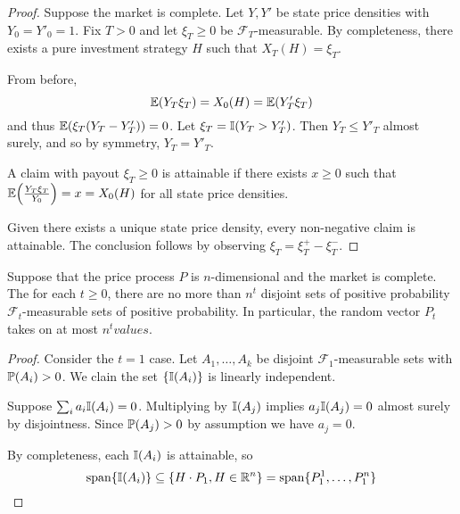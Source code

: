 \begin{proof}
  Suppose the market is complete.  Let $Y, Y'$ be state price
  densities with $Y_{0} = Y'_{0}  = 1$.  Fix $T > 0$ and let $\xi_{T}
  \geq 0$ be $\mathcal{F}_{T}$-measurable.  By completeness, there
  exists a pure investment strategy $H$ such that $X_{T}(H) =
  \xi_{T}$.

  From before,
  \begin{equation}
    \label{eq:25}
    \E{Y_{T} \xi_{T}} = X_{0}(H) = \E{Y'_{T} \xi_{T}}
  \end{equation} and thus $\E{\xi_{T}(Y_{T} - Y'_{T})} = 0$.  Let
  $\xi_{T} = \I{Y_{T} > Y'_{T}}$. Then $Y_{T} \leq Y'_{T}$ almost
  surely, and so by symmetry, $Y_{T} = Y'_{T}$.

  A claim with payout $\xi_{T} \geq 0$ is attainable if there exists
  $x \geq 0$ such that $\E{\frac{Y_{T} \xi_{T}}{Y_{0}}} = x =
  X_{0}(H)$ for all state price densities.

  Given there exists a unique state price density, every non-negative
  claim is attainable.  The conclusion follows by observing $\xi_{T} =
  \xi_{T}^{+} - \xi_{T}^{-}$.
\end{proof}

\begin{thm}
  \label{defn:discrete_time_models:28}
  Suppose that the price process $P$ is $n$-dimensional and the market
  is complete.  The for each $t \geq 0$, there are no more than
  $n^{t}$ disjoint sets of positive probability
  $\mathcal{F}_{t}$-measurable sets of positive probability.  In
  particular, the random vector $P_{t}$ takes on at most $n^{t} values$.
\end{thm}

\begin{proof}
  Consider the $t=1$ case.  Let $A_{1}, \dots, A_{k}$ be  disjoint
  $\mathcal{F}_{1}$-measurable sets with $\Prob{A_{i}} > 0$.  We clain
  the set $\{ \I{A_{i}} \}$ is linearly independent.

  Suppose $\sum_{i} a_{i} \I{A_{i}} = 0$.  Multiplying by $\I{A_{j}}$
  implies $a_{j} \I{A_{j}} = 0$ almost surely by disjointness.  Since
  $\Prob{A_{j}} > 0$ by assumption we have $a_{j} = 0$.

  By completeness, each $\I{A_{i}}$ is attainable, so
  \begin{equation}
    \label{eq:26}
    \vecspan \{ \I{A_{i}} \} \subseteq \{ H \cdot P_{1}, H \in \R^{n} \}
    =  \vecspan \{ P^{1}_{1}, \dots, P^{n}_{1} \}
  \end{equation} 
\end{proof}

